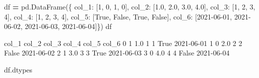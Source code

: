 \documentclass[
]{book}
\newenvironment{Shaded}{\begin{snugshade}}{\end{snugshade}}
\newcommand{\DecValTok}[1]{\textcolor[rgb]{0.00,0.00,0.81}{#1}}
\newcommand{\FloatTok}[1]{\textcolor[rgb]{0.00,0.00,0.81}{#1}}
\newcommand{\NormalTok}[1]{#1}
\newcommand{\OperatorTok}[1]{\textcolor[rgb]{0.81,0.36,0.00}{\textbf{#1}}}
\newcommand{\StringTok}[1]{\textcolor[rgb]{0.31,0.60,0.02}{#1}}
\newcommand{\VariableTok}[1]{\textcolor[rgb]{0.00,0.00,0.00}{#1}}
\begin{document}
\begin{Shaded}
\begin{Highlighting}[]
\NormalTok{df }\OperatorTok{=}\NormalTok{ pd.DataFrame(\{}
                   \StringTok{\textquotesingle{}col\_1\textquotesingle{}}\NormalTok{: [}\DecValTok{1}\NormalTok{, }\DecValTok{0}\NormalTok{, }\DecValTok{1}\NormalTok{, }\DecValTok{0}\NormalTok{], }
                   \StringTok{\textquotesingle{}col\_2\textquotesingle{}}\NormalTok{: [}\FloatTok{1.0}\NormalTok{, }\FloatTok{2.0}\NormalTok{, }\FloatTok{3.0}\NormalTok{, }\FloatTok{4.0}\NormalTok{], }
                   \StringTok{\textquotesingle{}col\_3\textquotesingle{}}\NormalTok{: [}\StringTok{\textquotesingle{}1\textquotesingle{}}\NormalTok{, }\StringTok{\textquotesingle{}2\textquotesingle{}}\NormalTok{, }\StringTok{\textquotesingle{}3\textquotesingle{}}\NormalTok{, }\StringTok{\textquotesingle{}4\textquotesingle{}}\NormalTok{],}
                   \StringTok{\textquotesingle{}col\_4\textquotesingle{}}\NormalTok{: [}\StringTok{\textquotesingle{}1\textquotesingle{}}\NormalTok{, }\DecValTok{2}\NormalTok{, }\StringTok{\textquotesingle{}3\textquotesingle{}}\NormalTok{, }\DecValTok{4}\NormalTok{],}
                   \StringTok{\textquotesingle{}col\_5\textquotesingle{}}\NormalTok{: [}\VariableTok{True}\NormalTok{, }\VariableTok{False}\NormalTok{, }\VariableTok{True}\NormalTok{, }\VariableTok{False}\NormalTok{],}
                   \StringTok{\textquotesingle{}col\_6\textquotesingle{}}\NormalTok{: [}\StringTok{\textquotesingle{}2021{-}06{-}01\textquotesingle{}}\NormalTok{, }\StringTok{\textquotesingle{}2021{-}06{-}02\textquotesingle{}}\NormalTok{, }\StringTok{\textquotesingle{}2021{-}06{-}03\textquotesingle{}}\NormalTok{, }\StringTok{\textquotesingle{}2021{-}06{-}04\textquotesingle{}}\NormalTok{]\})}
\NormalTok{df}
\end{Highlighting}
\end{Shaded}

\begin{Shaded}
\begin{Highlighting}[]
\NormalTok{   col\_1  col\_2 col\_3 col\_4  col\_5       col\_6}
\NormalTok{0      1    1.0     1     1   True  2021{-}06{-}01}
\NormalTok{1      0    2.0     2     2  False  2021{-}06{-}02}
\NormalTok{2      1    3.0     3     3   True  2021{-}06{-}03}
\NormalTok{3      0    4.0     4     4  False  2021{-}06{-}04}
\end{Highlighting}
\end{Shaded}

\begin{Shaded}
\begin{Highlighting}[]
\NormalTok{df.dtypes}
\end{Highlighting}
\end{Shaded}
\end{document}
